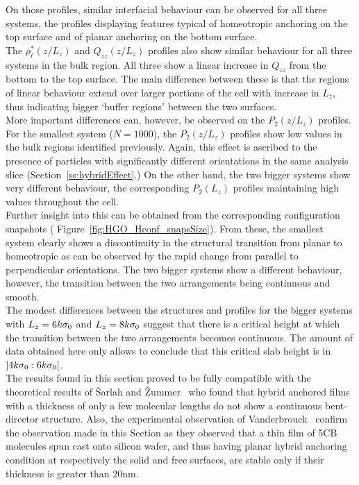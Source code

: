 On those profiles, similar interfacial behaviour can be observed for all three systems, the
profiles displaying features typical of homeotropic anchoring on the top surface and of planar
anchoring on the bottom surface.\\
%
The $\rho^{*}_\ell(z/L_z)$ and $Q_{zz}(z/L_z)$ profiles also show similar behaviour for all
three systems in the bulk region. All three show a linear increase in $Q_{zz}$ from
the bottom to the top surface. The main difference between these is that the regions of linear
behaviour extend over larger portions of the cell with increase in $L_z$, thus
indicating bigger `buffer regions' between the two surfaces.\\

More important differences can, however, be observed on the $P_2(z/L_z)$ profiles. For the
smallest system ($N=1000$), the $P_2(z/L_z)$ profiles show low values in the bulk regions
identified previously. Again, this effect is ascribed to the presence of particles with
significantly different orientations in the same analysis slice (Section~\ref{ss:hybridEffect}.)
On the other hand, the two bigger systems show very different behaviour, the corresponding
$P_2(L_z)$ profiles maintaining high values throughout the cell.\\
%
Further insight into this can be obtained from the corresponding configuration snapshots (\eg
Figure~\ref{fig:HGO_Hconf_snapsSize}). From these, the smallest system clearly shows a
discontinuity in the structural transition from planar to homeotropic as can be observed by the
rapid change from parallel to perpendicular orientations. The two bigger systems show a
different behaviour, however, the transition between the two arrangements being continuous and
smooth.\\
The modest differences between the structures and profiles for the bigger systems with
$L_z=6k\sigma_0$ and $L_z=8k\sigma_0$ suggest that there is a critical height at which the transition
between the two arrangements becomes continuous. The amount of data obtained here only allows to
conclude that this %
critical slab height is in $]4k\sigma_0 : 6k\sigma_0[$.\\ %

The results found in this section proved to be fully compatible with the theoretical results of
\v{S}arlah and \v{Z}ummer~\cite{SarlahZummer99} who found that hybrid anchored films with a
thickness of only a few molecular lengths do not show a continuous bent-director structure.
Also, the experimental observation of Vanderbrouck~\etal\cite{VandenbrouckValignat99} confirm
the observation made in this Section as they observed that a thin film of 5CB molecules spun cast
onto silicon wafer, and thus having planar hybrid anchoring condition at respectively the solid
and free surfaces, are stable only if their thickness is greater than 20nm.

